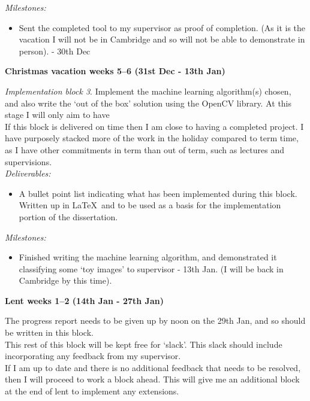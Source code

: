 {\em Milestones:}
\begin{itemize}
    \item 
    Sent the completed tool to my supervisor as proof of completion. (As it is 
    the vacation I will not be in Cambridge and so will not be able to 
    demonstrate in person). - 30th Dec
\end{itemize}




{\bf Christmas vacation weeks 5--6 (31st Dec - 13th Jan)} 

{\em Implementation block 3}. Implement the machine learning algorithm(s) 
chosen, and also write the `out of the box' solution using the OpenCV 
library. At this stage I will only aim to have  \\

If this block is delivered on time then I am close to having a completed 
project. I have purposely stacked more of the work in the holiday compared to 
term time, as I have other commitments in term than out of term, such as 
lectures and supervisions. \\

{\em Deliverables:} 
\begin{itemize} 
    \item 
    A bullet point list indicating what has been implemented during this block. 
    Written up in \LaTeX\ and to be used as a basis for the implementation 
    portion of the dissertation.
\end{itemize}

{\em Milestones:}
\begin{itemize}
    \item 
    Finished writing the machine learning algorithm, and demonstrated it 
    classifying some `toy images' to supervisor - 13th Jan. (I will be back in 
    Cambridge by this time).
\end{itemize}




{\bf Lent weeks 1--2 (14th Jan - 27th Jan)} 

The progress report needs to be given up by noon on the 29th Jan, and so should 
be written in this block. \\

This rest of this block will be kept free for `slack'. This slack should include 
incorporating any feedback from my supervisor. \\

If I am up to date and there is no additional feedback that needs to be resolved, 
then I will proceed to work a block ahead. This will give me an additional block 
at the end of lent to implement any extensions. \\

